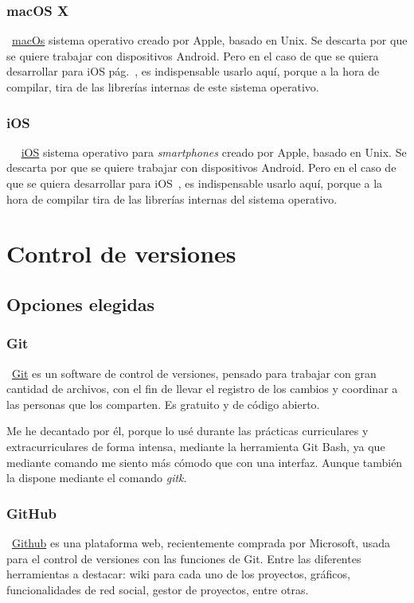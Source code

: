\subsubsection{macOS X}
~\href{https://www.apple.com/es/macos}{macOs} sistema operativo creado por Apple, basado en Unix. Se descarta por que se quiere trabajar con dispositivos Android. Pero en el caso de que se quiera desarrollar para iOS pág.~\pageref{ios}, es indispensable usarlo aquí, porque a la hora de compilar, tira de las librerías internas de este sistema operativo.

\subsubsection{iOS}~\label{ios}
~\href{https://www.apple.com/es/ios}{iOS} sistema operativo para \emph{smartphones} creado por Apple, basado en Unix. Se descarta por que se quiere trabajar con dispositivos Android. Pero en el caso de que se quiera desarrollar para iOS~\pageref{ios}, es indispensable usarlo aquí, porque a la hora de compilar tira de las librerías internas del sistema operativo.

\section{Control de versiones}

\subsection{Opciones elegidas}

\subsubsection{Git}
~\href{https://git-scm.com//}{Git} es un software de control de versiones, pensado para trabajar con gran cantidad de archivos, con el fin de llevar el registro de los cambios y coordinar a las personas que los comparten. Es gratuito y de código abierto.

Me he decantado por él, porque lo usé durante las prácticas curriculares y extracurriculares de forma intensa, mediante la herramienta Git Bash, ya que mediante comando me siento más cómodo que con una interfaz. Aunque también la dispone mediante el comando \emph{gitk}.

\subsubsection{GitHub}\label{github}
~\href{https://github.com/}{Github} es una plataforma web, recientemente comprada por Microsoft, usada para el control de versiones con las funciones de Git. Entre las diferentes herramientas a destacar: wiki para cada uno de los proyectos, gráficos, funcionalidades de red social, gestor de proyectos, entre otras.

